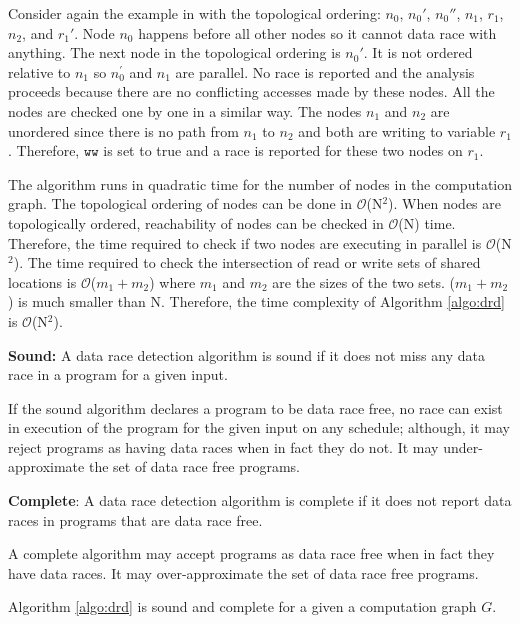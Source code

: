 Consider again the example in  with the topological ordering: $n_0$, $n_0'$, $n_0''$, $n_1$, $r_1$, $n_2$, and $r_1'$. Node $n_0$ happens before all other nodes so it cannot data race with anything. The next node in the topological ordering is $n_0'$. It is not ordered relative to $n_1$ so $n_0^\prime$ and $n_1$ are parallel. No race is reported and the analysis proceeds because there are no conflicting accesses made by these nodes. All the nodes are checked one by one in a similar way. The nodes $n_1$ and $n_2$ are unordered since there is no path from $n_1$ to $n_2$ and both are writing to variable $r_1$. Therefore, $\mathtt{ww}$ is set to true and a race is reported for these two nodes on $r_1$.

The algorithm runs in quadratic time for the number of nodes in the computation graph. The topological ordering of nodes can be done in $\mathcal{O}$(N$^2$). When nodes are topologically ordered, reachability of nodes can be checked in $\mathcal{O}$(N) time. Therefore, the time required to check if two nodes are executing in parallel is $\mathcal{O}$(N$^2$). The time required to check the intersection of read or write sets of shared locations is $\mathcal{O}$($m_1 +  m_2$) where $m_1$ and $m_2$ are the sizes of the two sets. ($m_1 + m_2$) is much smaller than N. Therefore, the time complexity of Algorithm \ref{algo:drd}  is $\mathcal{O}$(N$^2$).

\begin{definition} 
\textbf{Sound:} A data race detection algorithm is sound if it does not miss any data race in a program for a given input.
\end{definition}

If the sound algorithm declares a program to be data race free, no race can exist in execution of the program for the given input on any schedule; although, it may reject programs as having data races when in fact they do not. It may under-approximate the set of data race free programs.

\begin{definition}
\textbf{Complete}:  A data race detection algorithm is complete if it does not report data races in programs that are data race free.
\end{definition}

A complete algorithm may accept programs as data race free when in fact they have data races. It may over-approximate the set of data race free programs.

\begin{theorem} \label{thm:graph}
Algorithm \ref{algo:drd} is sound and complete for a given a computation graph $G$.
\end{theorem}

